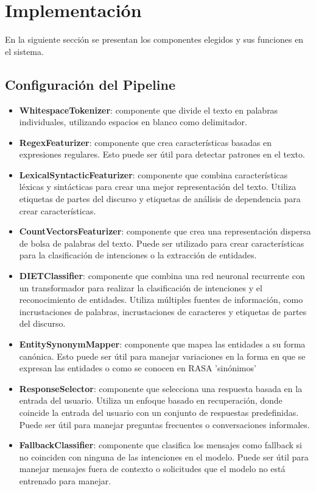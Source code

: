 \section{Implementación}
En la siguiente sección se presentan los componentes elegidos y sus funciones en el
sistema.
\subsection{Configuración del Pipeline}
\begin{itemize}
	\item \textbf{WhitespaceTokenizer}: componente que divide el texto en palabras
	      individuales, utilizando espacios en blanco como delimitador.
	      \cite{Configuration_Documentation}
	\item \textbf{RegexFeaturizer}: componente que crea características basadas en expresiones
	      regulares. Esto puede ser útil para detectar patrones en el texto.
	      \cite{Configuration_Documentation}
	\item \textbf{LexicalSyntacticFeaturizer}: componente que combina características léxicas y
	      sintácticas para crear una mejor representación del texto. Utiliza etiquetas de
	      partes del discurso
	      y etiquetas de análisis de dependencia para crear características.
	      \cite{Configuration_Documentation}
	\item \textbf{CountVectorsFeaturizer}: componente que crea una representación dispersa de
	      bolsa de
	      palabras del texto. Puede ser utilizado para crear características para la
	      clasificación de
	      intenciones o la extracción de entidades. \cite{Configuration_Documentation}
	\item \textbf{DIETClassifier}: componente que combina una red neuronal recurrente con un
	      transformador para realizar la clasificación de intenciones y el reconocimiento de
	      entidades.
	      Utiliza múltiples fuentes de información, como incrustaciones de palabras,
	      incrustaciones de
	      caracteres y etiquetas de partes del discurso. \cite{Configuration_Documentation}
	\item \textbf{EntitySynonymMapper}: componente que mapea las entidades a su forma canónica.
	      Esto puede ser útil para manejar variaciones en la forma en que se expresan las entidades o como se
	      conocen en RASA 'sinónimos'\cite{Configuration_Documentation}
	\item \textbf{ResponseSelector}: componente que selecciona una respuesta basada en la
	      entrada del
	      usuario. Utiliza un enfoque basado en recuperación, donde coincide la entrada del
	      usuario con un
	      conjunto de respuestas predefinidas. Puede ser útil para manejar preguntas frecuentes
	      o
	      conversaciones informales.\cite{Configuration_Documentation}
	\item \textbf{FallbackClassifier}: componente que clasifica los mensajes como fallback si
	      no coinciden con ninguna de las intenciones en el modelo. Puede ser útil para manejar mensajes
	      fuera de contexto o solicitudes que el modelo no está entrenado para
	      manejar.\cite{Configuration_Documentation}
\end{itemize}
